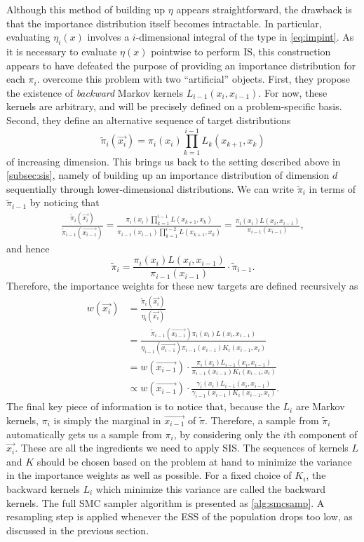 Although this method of building up $\eta$ appears straightforward, the
drawback is that the importance distribution itself becomes intractable. In
particular, evaluating $\eta_i(x)$ involves a $i$-dimensional integral of the
type in \cref{eq:impint}. As it is necessary to evaluate $\eta(x)$ pointwise to
perform \gls{IS}, this construction appears to have defeated the purpose of
providing an importance distribution for each $\pi_i$.
\textcite{del2006sequential} overcome this problem with two ``artificial''
objects. First, they propose the existence of \textit{backward} Markov kernels
$L_{i-1}(x_i, x_{i-1})$. For now, these kernels are arbitrary, and will be
precisely defined on a problem-specific basis. Second, they define an
alternative sequence of target distributions
\[
  \tilde{\pi}_i(\vec{x_i}) = \pi_i(x_i) \prod_{k=1}^{i-1} L_k(x_{k+1}, x_k)
\]
of increasing dimension. This brings us back to the setting described above in
\cref{subsec:sis}, namely of building up an importance distribution of
dimension $d$ sequentially through lower-dimensional distributions. We can
write $\tilde{\pi}_i$ in terms of $\tilde{\pi}_{i-1}$ by noticing that
\begin{align*}
  \frac{\tilde{\pi}_i(\vec{x_i})}{\tilde{\pi}_{i-1}(\vec{x_{i-1}})} 
  = \frac{\pi_i(x_i) \prod_{k=1}^{i-1} L(x_{k+1}, x_k)}
  {\pi_{i-1}(x_{i-1}) \prod_{k=1}^{i-2} L(x_{k+1}, x_k)}
  = \frac{\pi_i(x_i) L(x_i, x_{i-1})}{\pi_{i-1}(x_{i-1})},
\end{align*}
and hence
\[
  \tilde{\pi}_i = \frac{\pi_i(x_i) L(x_i, x_{i-1})}{\pi_{i-1}(x_{i-1})} \cdot \tilde{\pi}_{i-1}.
\]
Therefore, the importance weights for these new targets are defined recursively as
\begin{align}
  w(\vec{x_i}) 
    &= \frac{\tilde{\pi}_i(\vec{x_i})}{\eta_i(\vec{x_i})} \\
    &= \frac{\tilde{\pi}_{i-1}(\vec{x_{i-1}}) \pi_i(x_i) L(x_i, x_{i-1})}
           {\eta_{i-1}(\vec{x_{i-1}}) \pi_{i-1}(x_{i-1}) K_i(x_{i-1}, x_i)} \\
    &= w(\vec{x_{i-1}}) \cdot
      \frac{\pi_i(x_i) L_{i-1}(x_i, x_{i-1})}
           {\pi_{i-1}(x_{i-1}) K_i(x_{i-1}, x_i)} \\
    &\propto w(\vec{x_{i-1}}) \cdot
      \frac{\gamma_i(x_i) L_{i-1}(x_i, x_{i-1})}
           {\gamma_{i-1}(x_{i-1}) K_i(x_{i-1}, x_i)}.
    \label{eq:smcwt}
\end{align}
The final key piece of information is to notice that, because the $L_i$ are
Markov kernels, $\pi_i$ is simply the marginal in $\vec{x_{i-1}}$ of
$\tilde{\pi}$. Therefore, a sample from $\tilde{\pi}_i$ automatically gets us a
sample from $\pi_i$, by considering only the $i$th component of $\vec{x_i}$.
These are all the ingredients we need to apply \gls{SIS}. The sequences of
kernels $L$ and $K$ should be chosen based on the problem at hand to minimize
the variance in the importance weights as well as possible. For a fixed choice
of $K_i$, the backward kernels $L_i$ which minimize this variance are called
the  backward kernels. The full \gls{SMC} sampler algorithm is
presented as \cref{alg:smcsamp}. A resampling step is applied whenever the
\gls{ESS} of the population drops too low, as discussed in the previous
section.

